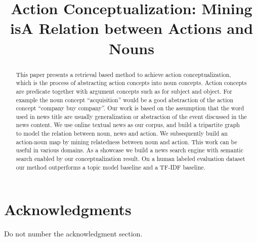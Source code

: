 \documentclass[11pt,letterpaper]{article}
\title{Action Conceptualization: Mining isA Relation between Actions and Nouns}
\author{%
  }
\date{}
\begin{document}
\maketitle

\begin{abstract}
  This paper presents a retrieval based method to achieve action conceptualization,
  which is the process of abstracting action concepts into noun concepts. Action
  concepts are predicate together with argument concepts such as for subject and
  object. For example the noun concept ``acquisition'' would be a good abstraction
  of the action concept ``company buy company''.
  Our work is based on the assumption that the word used in news title are
  usually generalization or abstraction of the event discussed in the news content.
  We use online textual news as our corpus, and build a tripartite graph to model
  the relation between noun, news and action. We subsequently build an action-noun map
  by mining relatedness between noun and action. This work can be useful in various
  domains. As a showcase we build a news search engine with semantic search enabled
  by our conceptualization result. On a human labeled evaluation dataset our method
  outperforms a topic model baseline and a TF-IDF baseline.
\end{abstract}
















\section*{Acknowledgments}

Do not number the acknowledgment section.



\end{document}

